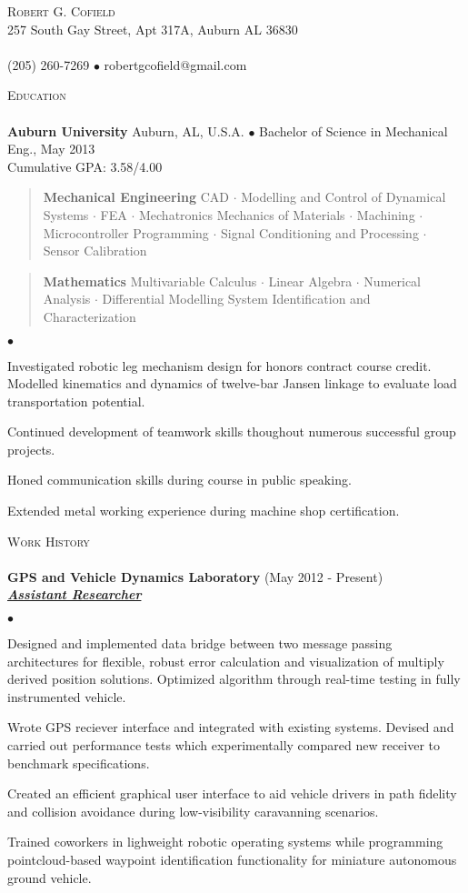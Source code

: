 \documentclass{article}
\newcommand{\area} [2] {
	\vspace*{-9pt}
	\begin{verse}
		\textbf{#1}   #2
	\end{verse} 
}
\newcommand{\lineunder} {
	\vspace*{-8pt} \\
	\hspace*{-18pt} \hrulefill \\
}
\newcommand{\header} [1] {
	{\hspace*{-15pt}\vspace*{6pt} \textsc{#1}} 
	\vspace*{-6pt} \lineunder
}
\newcommand{\employer} [3] {
	{ \textbf{#1} (#2)\\ \underline{\textbf{\emph{#3}}}\\  }
}
\newcommand{\contact} [3] {
	\vspace*{-8pt}
	\begin{center}
		{\LARGE \scshape {#1}}\\
		#2 \lineunder 	#3
	\end{center}
	\vspace*{-8pt}
}
\newenvironment{achievements}{
	\begin{list}
		{$\bullet$}{\topsep 0pt \itemsep -2pt}}{\vspace*{4pt}
	\end{list}
}
\newcommand{\schoolwithcourses} [4] {
	 \textbf{#1} #2 $\bullet$ #3\\ 
	#4 \\
	\vspace*{5pt}
}
\begin{document}
\vspace*{-44pt}

\contact{Robert G. Cofield}
{257 South Gay Street, Apt 317A, Auburn AL 36830}
{(205) 260-7269 $\bullet$ robertgcofield@gmail.com}

\header{Education}

\schoolwithcourses{Auburn University}{Auburn, AL, U.S.A.}{Bachelor of Science in Mechanical Eng., May 2013}
{Cumulative GPA: 3.58/4.00}
	\area{Mechanical Engineering}{ CAD $\cdot$ Modelling and Control of Dynamical Systems $\cdot$ FEA $\cdot $ Mechatronics  Mechanics of Materials $\cdot$ Machining $\cdot$ Microcontroller Programming $\cdot$ Signal Conditioning and Processing $\cdot$ Sensor Calibration}
	\area{Mathematics}{Multivariable Calculus $\cdot$ Linear Algebra $\cdot$ Numerical Analysis $\cdot$ Differential Modelling System Identification and Characterization}
	\begin{achievements}
	\item Investigated robotic leg mechanism design for honors contract course credit. Modelled kinematics and dynamics of twelve-bar Jansen linkage to evaluate load transportation potential.
	\item Continued development of teamwork skills thoughout numerous successful group projects.
	\item Honed communication skills during course in public speaking.
	\item Extended metal working experience during machine shop certification.
	\end{achievements}


\header{Work History}

\employer{GPS and Vehicle Dynamics Laboratory}{May 2012 - Present}{Assistant Researcher}
	\begin{achievements}
	\item Designed and implemented data bridge between two message passing architectures for flexible, robust error calculation and visualization of multiply derived position solutions. Optimized algorithm through real-time testing in fully instrumented vehicle.
	\item Wrote GPS reciever interface and integrated with existing systems. Devised and carried out performance tests which experimentally compared new receiver to benchmark specifications.
	\item Created an efficient graphical user interface to aid vehicle drivers in path fidelity and collision avoidance during low-visibility caravanning scenarios.
	\item Trained coworkers in lighweight robotic operating systems while programming pointcloud-based waypoint identification functionality for miniature autonomous ground vehicle.
	\end{achievements}
\end{document}
